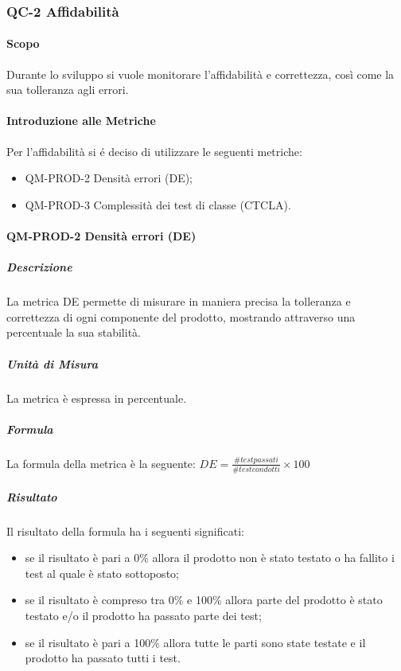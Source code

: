 	\subsubsection{QC-2 Affidabilità}
		\paragraph{Scopo}
		Durante lo sviluppo si vuole monitorare l'affidabilità e correttezza, così come la sua tolleranza agli errori.
		\paragraph{Introduzione alle Metriche}
			Per l'affidabilità si é deciso di utilizzare le seguenti metriche:
			\begin{itemize}
				\item QM-PROD-2 Densità errori (DE);
				\item QM-PROD-3 Complessità dei test di classe (CTCLA).
			\end{itemize}
		\paragraph{ QM-PROD-2 Densità errori (DE)}
			\subparagraph{Descrizione}
				La metrica DE permette di misurare in maniera precisa la tolleranza e correttezza di ogni componente del prodotto, mostrando attraverso una percentuale la sua stabilità.
			\subparagraph{Unità di Misura}
				La metrica è espressa in percentuale.
			\subparagraph{Formula}
				La formula della metrica è la seguente:
				\(DE = \frac{\# test passati}{\# test condotti}\times100\)
			\subparagraph{Risultato}
				Il risultato della formula ha i seguenti significati:
				\begin{itemize}
					\item se il risultato è pari a 0\% allora il prodotto non è stato testato o ha fallito i test al quale è stato sottoposto;
					\item se il risultato è compreso tra 0\% e 100\% allora parte del prodotto è stato testato e/o il prodotto ha passato parte dei test;
					\item se il risultato è pari a 100\% allora tutte le parti sono state testate e il prodotto ha passato tutti i test.
				\end{itemize}
